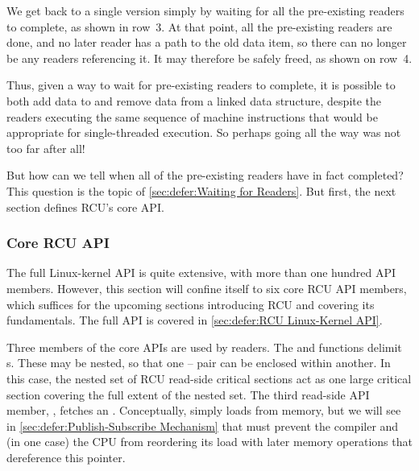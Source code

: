 We get back to a single version simply by waiting for all the
pre-existing readers to complete, as shown in row~3.
At that point, all the pre-existing readers are done, and no later
reader has a path to the old data item, so there can no longer be
any readers referencing it.
It may therefore be safely freed, as shown on row~4.

Thus, given a way to wait for pre-existing readers to complete,
it is possible to both add data to and remove data from a linked
data structure, despite the readers executing the same sequence
of machine instructions that would be appropriate for single-threaded
execution.
So perhaps going all the way was not too far after all!

But how can we tell when all of the pre-existing readers have in
fact completed?
This question is the topic of \cref{sec:defer:Waiting for Readers}.
But first, the next section defines RCU's core API.

\subsubsection{Core RCU API}
\label{sec:defer:Core RCU API}

The full Linux-kernel API is quite extensive, with more than one
hundred API members.
However, this section will confine itself to six core RCU API members,
which suffices for the upcoming sections introducing RCU and covering
its fundamentals.
The full API is covered in \cref{sec:defer:RCU Linux-Kernel API}.

Three members of the core APIs are used by readers.
The  and  functions delimit
s.
These may be nested, so that one --
pair can be enclosed within another.
In this case, the nested set of RCU read-side critical sections act as
one large critical section covering the full extent of the nested set.
The third read-side API member, , fetches an
.
Conceptually,  simply loads from memory, but we
will see in
\cref{sec:defer:Publish-Subscribe Mechanism}
that  must prevent the compiler and (in
one case) the CPU from reordering its load with later memory operations
that dereference this pointer.

\QuickQuizEnd

